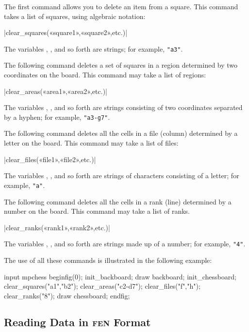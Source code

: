 \documentclass[english]{ltxdoc}
\begin{document}
The first command allows you to delete an item from a square. This command takes
a list of squares, using algebraic notation:

\commande|clear_squares(«square1»,«square2»,etc.)|\smallskip

The variables \textbf{}, \textbf{},
and so forth are strings; for example, \lstinline+"a3"+.
\medskip

The following command deletes a set of squares in a region
determined by two coordinates on the board. This command may take
a list of regions:

\commande|clear_areas(«area1»,«area2»,etc.)|\smallskip

The variables \textbf{}, \textbf{}, and so
forth are strings consisting of two coordinates separated by a hyphen; for example, \lstinline+"a3-g7"+.
\medskip

The following command deletes all the cells in a file (column) determined by a
letter on the board. This command may take a list of files:


\commande|clear_files(«file1»,«file2»,etc.)|\smallskip

The variables \textbf{}, \textbf{}, and so
forth are strings of characters consisting of a letter; for example, \lstinline+"a"+.
\medskip

The following command deletes all the cells in a rank (line) determined by a
number on the board. This command may take a list of ranks.

\commande|clear_ranks(«rank1»,«rank2»,etc.)|\smallskip

The variables \textbf{}, \textbf{}, and so
forth are strings made up of a number; for example, \lstinline+"4"+.

The use of all these commands is illustrated in the following example:

\begin{ExempleMP}
input mpchess
beginfig(0);
init_backboard;
draw backboard;
init_chessboard;
clear_squares("a1","b2");
clear_areas("c2-d7");
clear_files("f","h");
clear_ranks("8");
draw chessboard;
endfig;
\end{ExempleMP}



\subsection{Reading Data in \textsc{fen} Format}
\end{document}
